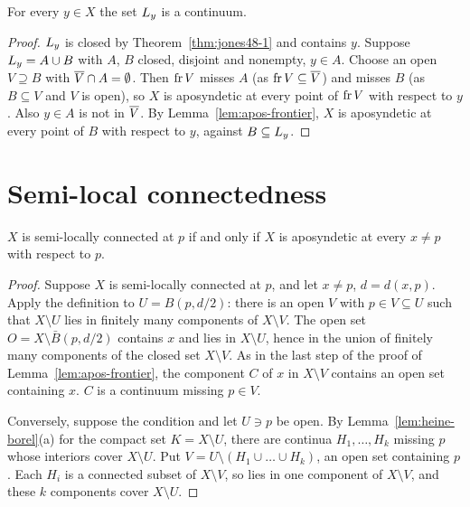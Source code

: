 \begin{theorem}\label{thm:jones48-3}
For every $y\in X$ the set $L_{y}$ is a continuum.
\end{theorem}

\begin{proof}
$L_{y}$ is closed by Theorem~\ref{thm:jones48-1} and contains $y$. Suppose $L_{y}=A\cup B$ with $A$, $B$ closed,
disjoint and nonempty, $y\in A$. Choose an open $V\supseteq B$ with $\overline{V}\cap A=\emptyset$. Then $\operatorname{fr} V$
misses $A$ (as $\operatorname{fr} V\subseteq\overline{V}$) and misses $B$ (as $B\subseteq V$ and $V$ is open), so $X$ is
aposyndetic at every point of $\operatorname{fr} V$ with respect to $y$. Also $y\in A$ is not in $\overline{V}$. By
Lemma~\ref{lem:apos-frontier}, $X$ is aposyndetic at every point of $B$ with respect to $y$, against
$B\subseteq L_{y}$.
\end{proof}


\section{Semi-local connectedness}

\begin{theorem}\label{thm:jones48-0}
$X$ is semi-locally connected at $p$ if and only if $X$ is aposyndetic at every $x\ne p$ with respect
to $p$.
\end{theorem}

\begin{proof}
Suppose $X$ is semi-locally connected at $p$, and let $x\ne p$, $d=d(x,p)$. Apply the definition to
$U=B(p,d/2)$: there is an open $V$ with $p\in V\subseteq U$ such that $X\setminus U$ lies in finitely many
components of $X\setminus V$. The open set $O=X\setminus\bar B(p,d/2)$ contains $x$ and lies in $X\setminus U$,
hence in the union of finitely many components of the closed set $X\setminus V$. As in the last step of the
proof of Lemma~\ref{lem:apos-frontier}, the component $C$ of $x$ in $X\setminus V$ contains an open set
containing $x$. $C$ is a continuum missing $p\in V$.

Conversely, suppose the condition and let $U\ni p$ be open. By Lemma~\ref{lem:heine-borel}(a) for the
compact set $K=X\setminus U$, there are continua $H_1,\dots,H_k$ missing $p$ whose interiors cover $X\setminus U$.
Put $V=U\setminus(H_1\cup\dots\cup H_k)$, an open set containing $p$. Each $H_i$ is a connected subset of
$X\setminus V$, so lies in one component of $X\setminus V$, and these $k$ components cover $X\setminus U$.
\end{proof}

